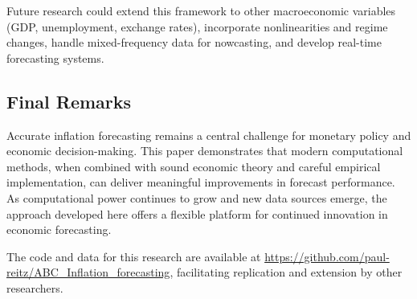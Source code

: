 Future research could extend this framework to other macroeconomic variables (GDP, unemployment, exchange rates), incorporate nonlinearities and regime changes, handle mixed-frequency data for nowcasting, and develop real-time forecasting systems.

\subsection{Final Remarks}

Accurate inflation forecasting remains a central challenge for monetary policy and economic decision-making. This paper demonstrates that modern computational methods, when combined with sound economic theory and careful empirical implementation, can deliver meaningful improvements in forecast performance. As computational power continues to grow and new data sources emerge, the approach developed here offers a flexible platform for continued innovation in economic forecasting.

The code and data for this research are available at \url{https://github.com/paul-reitz/ABC_Inflation_forecasting}, facilitating replication and extension by other researchers.
